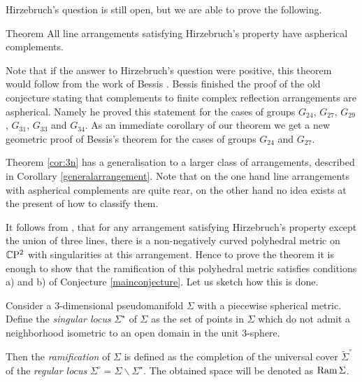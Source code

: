 \documentclass[oneside,a4paper]{article}
\def\Ram{\mathop{\rm Ram}\nolimits}
\begin{document}
Hirzebruch's question is still open, but we are able to prove the following.

\begin{thm}{Theorem}\label{cor:3n}
All line arrangements satisfying Hirzebruch's property have aspherical complements.
\end{thm}

Note that if the answer to Hirzebruch's question were positive, this theorem would follow from 
the work of Bessis \cite{bessis}. 
Bessis finished the proof of the old conjecture stating that complements to finite complex reflection arrangements are aspherical. 
Namely he proved this statement for the cases of groups  $G_{24}$, $G_{27}$, $G_{29}$, $G_{31}$, $G_{33}$ and $G_{34}$. 
As an immediate corollary of our theorem we get a new geometric proof of Bessis's theorem for the cases of groups  $G_{24}$ and $G_{27}$.

Theorem \ref{cor:3n} has a generalisation to a larger class of arrangements, described in Corollary \ref{generalarrangement}. 
Note that on the one hand line arrangements with aspherical complements are quite rear, on the other hand no idea exists at the present of how to classify them.  


It follows from \cite[Corollary 7.8]{panov},
that for any arrangement satisfying Hirzebruch's property except the union of three lines, there is a non-negatively curved polyhedral metric on $\mathbb{C}\mathrm{P}^2$ with singularities at this arrangement. Hence to prove the theorem it is enough to show that the ramification of this polyhedral metric satisfies conditions a) and b) of Conjecture \ref{mainconjecture}.  Let us sketch how this is done.

Consider a $3$-dimensional pseudomanifold $\Sigma$ with a piecewise spherical metric.
Define the \emph{singular locus} $\Sigma^{{\star}}$ of $\Sigma$
as the set of points in $\Sigma$ which do not admit a neighborhood isometric to an open domain in
the unit $3$-sphere.

Then the {\it ramification} of $\Sigma$
is defined as the  completion of the universal cover $\tilde {\Sigma}^\circ$ of the \emph{regular locus} $\Sigma^\circ=\Sigma\backslash\Sigma^{{\star}}$.
The obtained space will be denoted as $\Ram\Sigma$.
\end{document}
